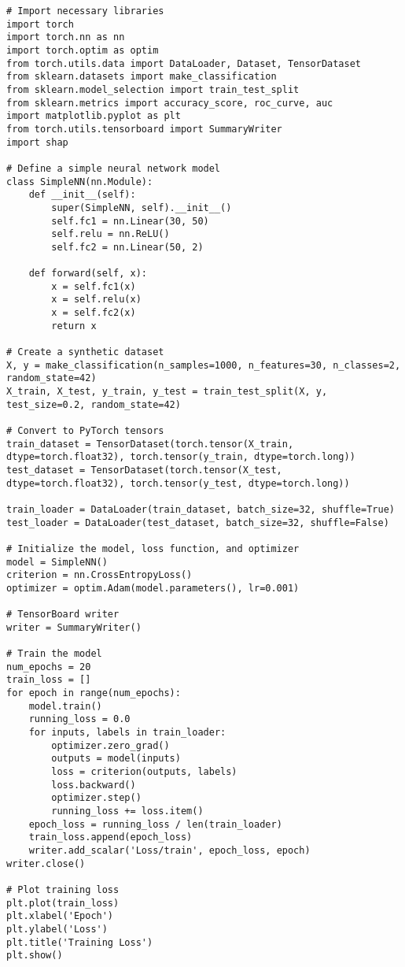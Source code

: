 \begin{verbatim}
# Import necessary libraries
import torch
import torch.nn as nn
import torch.optim as optim
from torch.utils.data import DataLoader, Dataset, TensorDataset
from sklearn.datasets import make_classification
from sklearn.model_selection import train_test_split
from sklearn.metrics import accuracy_score, roc_curve, auc
import matplotlib.pyplot as plt
from torch.utils.tensorboard import SummaryWriter
import shap

# Define a simple neural network model
class SimpleNN(nn.Module):
    def __init__(self):
        super(SimpleNN, self).__init__()
        self.fc1 = nn.Linear(30, 50)
        self.relu = nn.ReLU()
        self.fc2 = nn.Linear(50, 2)
    
    def forward(self, x):
        x = self.fc1(x)
        x = self.relu(x)
        x = self.fc2(x)
        return x

# Create a synthetic dataset
X, y = make_classification(n_samples=1000, n_features=30, n_classes=2, random_state=42)
X_train, X_test, y_train, y_test = train_test_split(X, y, test_size=0.2, random_state=42)

# Convert to PyTorch tensors
train_dataset = TensorDataset(torch.tensor(X_train, dtype=torch.float32), torch.tensor(y_train, dtype=torch.long))
test_dataset = TensorDataset(torch.tensor(X_test, dtype=torch.float32), torch.tensor(y_test, dtype=torch.long))

train_loader = DataLoader(train_dataset, batch_size=32, shuffle=True)
test_loader = DataLoader(test_dataset, batch_size=32, shuffle=False)

# Initialize the model, loss function, and optimizer
model = SimpleNN()
criterion = nn.CrossEntropyLoss()
optimizer = optim.Adam(model.parameters(), lr=0.001)

# TensorBoard writer
writer = SummaryWriter()

# Train the model
num_epochs = 20
train_loss = []
for epoch in range(num_epochs):
    model.train()
    running_loss = 0.0
    for inputs, labels in train_loader:
        optimizer.zero_grad()
        outputs = model(inputs)
        loss = criterion(outputs, labels)
        loss.backward()
        optimizer.step()
        running_loss += loss.item()
    epoch_loss = running_loss / len(train_loader)
    train_loss.append(epoch_loss)
    writer.add_scalar('Loss/train', epoch_loss, epoch)
writer.close()

# Plot training loss
plt.plot(train_loss)
plt.xlabel('Epoch')
plt.ylabel('Loss')
plt.title('Training Loss')
plt.show()


\end{verbatim}
